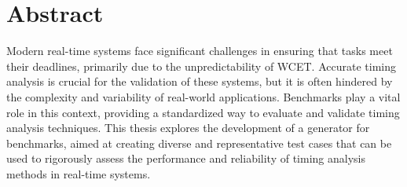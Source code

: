 \thispagestyle{plain}
\section*{Abstract}
Modern real-time systems face significant challenges in ensuring that tasks meet their deadlines, primarily due to the unpredictability of \ac{WCET}. 
Accurate timing analysis is crucial for the validation of these systems, but it is often hindered by the complexity and variability of real-world applications. 
Benchmarks play a vital role in this context, providing a standardized way to evaluate and validate timing analysis techniques. 
This thesis explores the development of a generator for benchmarks, aimed at creating diverse and representative test cases that can be used to rigorously assess the performance and reliability of timing analysis methods in real-time systems.
